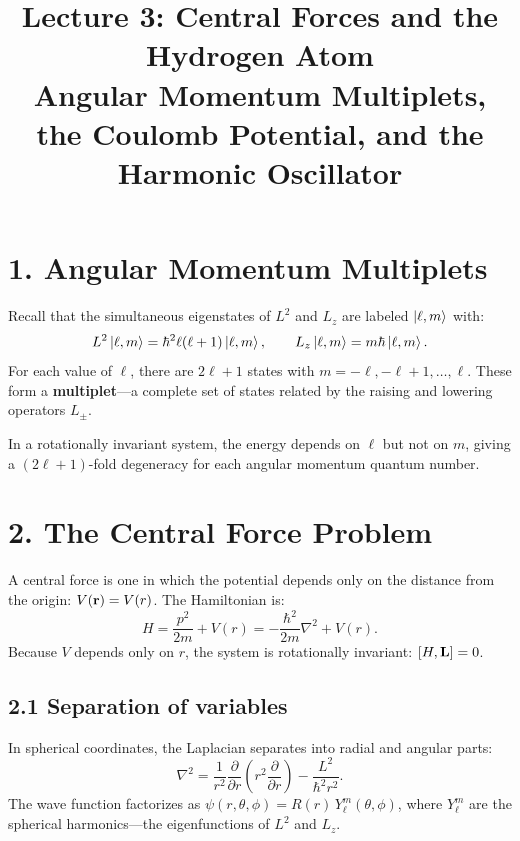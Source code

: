 \documentclass[12pt,a4paper]{article}
\title{\textbf{Lecture 3: Central Forces and the Hydrogen Atom} \\ \large Angular Momentum Multiplets, the Coulomb Potential, and the Harmonic Oscillator}
\date{}
\begin{document}
\maketitle
\thispagestyle{fancy}

\section{1. Angular Momentum Multiplets}

Recall that the simultaneous eigenstates of $L^2$ and $L_z$ are labeled $\ket{\ell, m}$ with:
\[
    L^2\ket{\ell, m} = \hbar^2\ell(\ell+1)\ket{\ell, m}, \qquad L_z\ket{\ell, m} = m\hbar\ket{\ell, m}.
\]
For each value of $\ell$, there are $2\ell + 1$ states with $m = -\ell, -\ell+1, \ldots, \ell$.  These form a \textbf{multiplet}---a complete set of states related by the raising and lowering operators $L_\pm$.

In a rotationally invariant system, the energy depends on $\ell$ but not on $m$, giving a $(2\ell+1)$-fold degeneracy for each angular momentum quantum number.

\section{2. The Central Force Problem}

A central force is one in which the potential depends only on the distance from the origin: $V(\vb{r}) = V(r)$.  The Hamiltonian is:
\[
    H = \frac{p^2}{2m} + V(r) = -\frac{\hbar^2}{2m}\nabla^2 + V(r).
\]
Because $V$ depends only on $r$, the system is rotationally invariant: $[H, \vb{L}] = 0$.

\subsection{2.1 Separation of variables}

In spherical coordinates, the Laplacian separates into radial and angular parts:
\[
    \nabla^2 = \frac{1}{r^2}\frac{\partial}{\partial r}\left(r^2\frac{\partial}{\partial r}\right) - \frac{L^2}{\hbar^2 r^2}.
\]
The wave function factorizes as $\psi(r, \theta, \phi) = R(r)\,Y_\ell^m(\theta, \phi)$, where $Y_\ell^m$ are the spherical harmonics---the eigenfunctions of $L^2$ and $L_z$.
\end{document}
